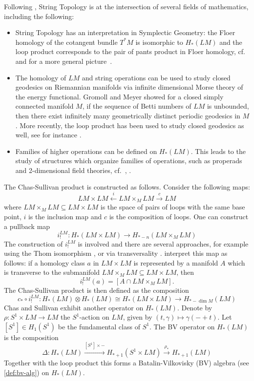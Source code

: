 \documentclass{scrartcl}
\theoremstyle{plain}
\theoremstyle{definition}
\renewcommand{\subset}{\subseteq}
\newcommand{\isect}{\mathbin{\cap}}
\newcommand{\iso}{\cong}
\let\xto\xrightarrow
\let\xfrom\xleftarrow
\newcommand{\blank}{-}
\newcommand{\comp}{\mathbin{\circ}}
\begin{document}
Following \cite[Sec. 1]{naef2022string}, String Topology is at the intersection of several fields of mathematics, including the following: 
\begin{itemize}
    \item String Topology has an interpretation in Symplectic Geometry: the Floer homology of the cotangent bundle $T^*M$ is isomorphic to $H_*(LM)$ and the loop product corresponds to the pair of pants product in Floer homology, cf.~\cite{abbondandolo2010floer} and for a more general picture~\cite{cieliebak2009role}. 
    \item The homology of $LM$ and string operations can be used to study closed geodesics on Riemannian manifolds via infinite dimensional Morse theory of the energy functional. Gromoll and Meyer \cite{gromoll1969periodic} showed for a closed simply connected manifold $M$, if the sequence of Betti numbers of $LM$ is unbounded, then there exist infinitely many geometrically distinct periodic geodesics in $M$. More recently, the loop product has been used to study closed geodesics as well, see for instance \cite{Goresky_2009}. 
    \item Families of higher operations can be defined on $H_*(LM)$. This leads to the study of structures which organize families of operations, such as properads and 2-dimensional field theories, cf.~\cite{godin2007higher}, \cite[I.2, I.3]{cohen2006string}.
\end{itemize}

The Chas-Sullivan product is constructed as follows. Consider the following maps: $$LM\times LM \xfrom{i} LM\times_M LM \xto{c} LM$$
where $LM\times_M LM\subset LM\times LM$ is the space of pairs of loops with the same base point, $i$ is the inclusion map and $c$ is the composition of loops. One can construct a pullback map $$i_!^{LM}\colon H_*(LM\times LM)\to H_{*-n}(LM\times_M LM)$$
The construction of $i_!^{LM}$ is involved and there are several approaches, for example using the Thom isomorphism \cite{cohen2006string}, \cite{hingston2017product} or via transversality \cite{chataur2005bordism}. \cite{chas1999string} interpret this map as follows: if a homology class $a$ in $LM\times LM$ is represented by a manifold $A$ which is transverse to the submanifold $LM\times_M LM\subset LM\times LM$, then $$i_!^{LM}(a) = [A\isect LM\times_M LM].$$ The Chas-Sullivan product is then defined as the composition $$c_*\comp i_!^{LM}\colon H_*(LM)\otimes H_*(LM)\iso H_*(LM\times LM)\to H_{*-\dim M}(LM)$$
Chas and Sullivan exhibit another operator on $H_*(LM)$. Denote by $\rho\colon S^1\times LM\to LM$ the $S^1$-action on $LM$, given by $(t,\gamma)\mapsto \gamma(\blank+t)$. Let $[S^1]\in H_1(S^1)$ be the fundamental class of $S^1$. The BV operator on $H_*(LM)$ is the composition 
$$\Delta\colon H_*(LM)\xto{[S^1]\times \blank} H_{*+1}(S^{1}\times LM)\xto{\rho_*} H_{*+1}(LM)$$
Together with the loop product this forms a Batalin-Vilkovisky (BV) algebra (see \cref{def:bv-alg}) on $H_*(LM)$. 
\end{document}
